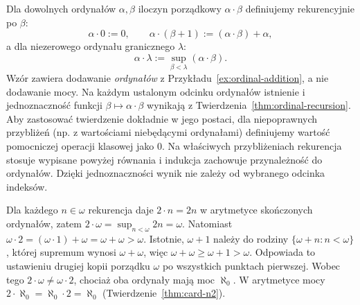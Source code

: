 \begin{definicja}
\label{def:ordinal-multiplication}
Dla dowolnych ordynałów $\alpha,\beta$
iloczyn porządkowy $\alpha\cdot\beta$
definiujemy rekurencyjnie po $\beta$:
\[
\alpha\cdot0:=0,\qquad
\alpha\cdot(\beta+1):=(\alpha\cdot\beta)+\alpha,
\]
a dla niezerowego ordynału granicznego $\lambda$:
\[
\alpha\cdot\lambda:=\sup_{\beta<\lambda}
(\alpha\cdot\beta).
\]
Wzór zawiera dodawanie \emph{ordynałów}
z Przykładu~\ref{ex:ordinal-addition},
a nie dodawanie mocy.
Na każdym ustalonym odcinku ordynałów
istnienie i jednoznaczność funkcji
$\beta\mapsto\alpha\cdot\beta$
wynikają z Twierdzenia~\ref{thm:ordinal-recursion}.
Aby zastosować twierdzenie dokładnie w jego postaci,
dla niepoprawnych przybliżeń (np. z wartościami
niebędącymi ordynałami) definiujemy wartość
pomocniczej operacji klasowej jako $0$.
Na właściwych przybliżeniach rekurencja
stosuje wypisane powyżej równania
i indukcja zachowuje przynależność do ordynałów.
Dzięki jednoznaczności wynik nie zależy
od wybranego odcinka indeksów.
\end{definicja}
\begin{przyklad}
\label{ex:ordinal-mul-noncommutative}
Dla każdego $n\in\omega$ rekurencja
daje $2\cdot n=2n$ w arytmetyce
skończonych ordynałów, zatem
$2\cdot\omega=\sup_{n<\omega}2n=\omega$.
Natomiast
$\omega\cdot2=(\omega\cdot1)+\omega
=\omega+\omega>\omega$.
Istotnie, $\omega+1$ należy do rodziny
$\{\omega+n:n<\omega\}$,
której supremum wynosi $\omega+\omega$,
więc $\omega+\omega\ge\omega+1>\omega$.
Odpowiada to ustawieniu drugiej kopii
porządku $\omega$ po wszystkich punktach pierwszej.
Wobec tego $2\cdot\omega\ne\omega\cdot2$,
chociaż oba ordynały mają moc $\aleph_0$.
W arytmetyce mocy
$2\cdot\aleph_0=\aleph_0\cdot2=\aleph_0$
(Twierdzenie~\ref{thm:card-n2}).
\end{przyklad}

